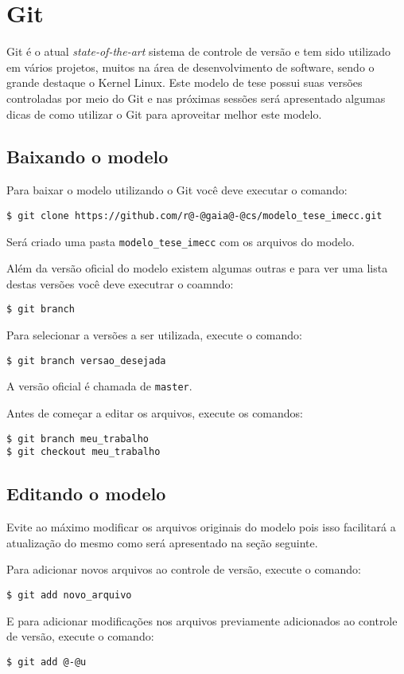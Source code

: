 \chapter{Git}
Git é o atual \textit{state-of-the-art} sistema de controle de versão e tem sido
utilizado em vários projetos, muitos na área de desenvolvimento de software,
sendo o grande destaque o Kernel Linux. Este modelo de tese possui suas versões
controladas por meio do Git e nas próximas sessões será apresentado algumas
dicas de como utilizar o Git para aproveitar melhor este modelo.

\section{Baixando o modelo}
Para baixar o modelo utilizando o Git você deve executar o comando:
\begin{lstlisting}[escapechar=@]
$ git clone https://github.com/r@-@gaia@-@cs/modelo_tese_imecc.git
\end{lstlisting}
Será criado uma pasta \lstinline+modelo_tese_imecc+ com os arquivos do
modelo.

Além da versão oficial do modelo existem algumas outras e para ver uma lista
destas versões você deve executrar o coamndo:
\begin{lstlisting}
$ git branch
\end{lstlisting}
Para selecionar a versões a ser utilizada, execute o comando:
\begin{lstlisting}
$ git branch versao_desejada
\end{lstlisting}
A versão oficial é chamada de \lstinline+master+.

Antes de começar a editar os arquivos, execute os comandos:
\begin{lstlisting}
$ git branch meu_trabalho
$ git checkout meu_trabalho
\end{lstlisting}

\section{Editando o modelo}
Evite ao máximo modificar os arquivos originais do modelo pois isso facilitará a
atualização do mesmo como será apresentado na seção seguinte.

Para adicionar novos arquivos ao controle de versão, execute o comando:
\begin{lstlisting}
$ git add novo_arquivo
\end{lstlisting}
E para adicionar modificações nos arquivos previamente adicionados ao controle
de versão, execute o comando:
\begin{lstlisting}[escapechar=@]
$ git add @-@u
\end{lstlisting}


